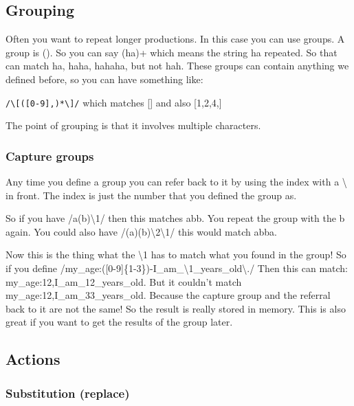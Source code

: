 \documentclass[
  11pt,
  british,
]{article}
\begin{document}
\hypertarget{grouping}{%
\subsection{Grouping}\label{grouping}}

Often you want to repeat longer productions. In this case you can use
groups. A group is (). So you can say (ha)+ which means the string ha
repeated. So that can match ha, haha, hahaha, but not hah. These groups
can contain anything we defined before, so you can have something like:

\texttt{/\textbackslash{}{[}({[}0-9{]},)*\textbackslash{}{]}/} which
matches {[}{]} and also {[}1,2,4,{]}

The point of grouping is that it involves multiple characters.

\hypertarget{capture-groups}{%
\subsubsection{Capture groups}\label{capture-groups}}

Any time you define a group you can refer back to it by using the index
with a \textbackslash{} in front. The index is just the number that you
defined the group as.

So if you have /a(b)\textbackslash1/ then this matches abb. You repeat
the group with the b again. You could also have
/(a)(b)\textbackslash2\textbackslash1/ this would match abba.

Now this is the thing what the \textbackslash1 has to match what you
found in the group! So if you define
/my\_age:({[}0-9{]}\{1-3\})-I\_am\_\textbackslash1\_years\_old\textbackslash./
Then this can match: my\_age:12,I\_am\_12\_years\_old. But it couldn't
match my\_age:12,I\_am\_33\_years\_old. Because the capture group and
the referral back to it are not the same! So the result is really stored
in memory. This is also great if you want to get the results of the
group later.

\hypertarget{actions}{%
\subsection{Actions}\label{actions}}

\hypertarget{substitution-replace}{%
\subsubsection{Substitution (replace)}\label{substitution-replace}}
\end{document}
